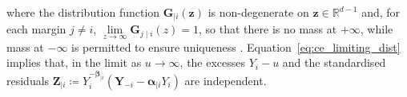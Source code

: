 \documentclass[12pt]{article}
\DeclareMathOperator{\CE}{\mathrm{CE}}
\begin{document}
where the distribution function $\symbf{G}_{\mid i}\left(\symbf{z}\right)$ is non-degenerate on $\symbf{z} \in \mathbb{R}^{d-1}$ and, for each margin $j\neq i$, $\lim\limits_{z\to\infty}\symbf{G}_{j\mid i}(z)=1$, so that there is no mass at $+\infty$, while mass at $-\infty$ is permitted to ensure uniqueness \citep{Keef2013}. 
Equation~\eqref{eq:ce_limiting_dist} implies that, in the limit as $u\to\infty$, the excesses $Y_i-u$ and the standardised residuals 
$\symbf{Z}_{\mid i} \coloneqq Y_i^{-\symbf{\beta}_{\mid i}}\left(\symbf{Y}_{-i} - \symbf{\alpha}_{\mid i} Y_{i}\right)$ are independent.
\end{document}
